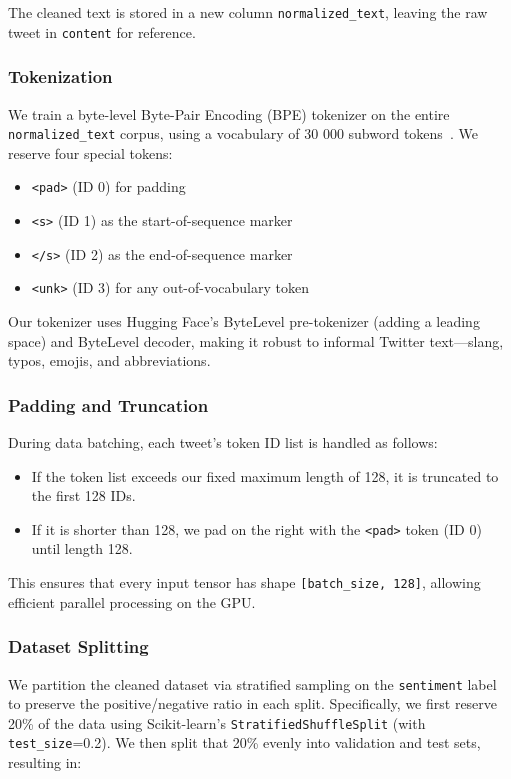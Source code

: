 \documentclass[twocolumn,superscriptaddress,aps]{revtex4-1}
\begin{document}
The cleaned text is stored in a new column \texttt{normalized\_text}, leaving the raw tweet in \texttt{content} for reference.

\subsubsection{Tokenization}
We train a byte-level Byte-Pair Encoding (BPE) tokenizer on the entire \texttt{normalized\_text} corpus, using a vocabulary of 30 000 subword tokens~\cite{BPE}. We reserve four special tokens:

\begin{itemize}
  \item \texttt{<pad>} (ID 0) for padding  
  \item \texttt{<s>} (ID 1) as the start-of-sequence marker  
  \item \texttt{</s>} (ID 2) as the end-of-sequence marker  
  \item \texttt{<unk>} (ID 3) for any out-of-vocabulary token  
\end{itemize}

Our tokenizer uses Hugging Face’s ByteLevel pre-tokenizer (adding a leading space) and ByteLevel decoder, making it robust to informal Twitter text—slang, typos, emojis, and abbreviations.

\subsubsection{Padding and Truncation}
During data batching, each tweet’s token ID list is handled as follows:

\begin{itemize}
  \item If the token list exceeds our fixed maximum length of 128, it is truncated to the first 128 IDs.
  \item If it is shorter than 128, we pad on the right with the \texttt{<pad>} token (ID 0) until length 128.
\end{itemize}

This ensures that every input tensor has shape \texttt{[batch\_size, 128]}, allowing efficient parallel processing on the GPU.



\subsubsection{Dataset Splitting}
\label{subsec:dataset_splitting}

We partition the cleaned dataset via stratified sampling on the \texttt{sentiment} label to preserve the positive/negative ratio in each split. Specifically, we first reserve 20\% of the data using Scikit-learn’s \texttt{StratifiedShuffleSplit} (with \texttt{test\_size}=0.2). We then split that 20\% evenly into validation and test sets, resulting in:
\end{document}
